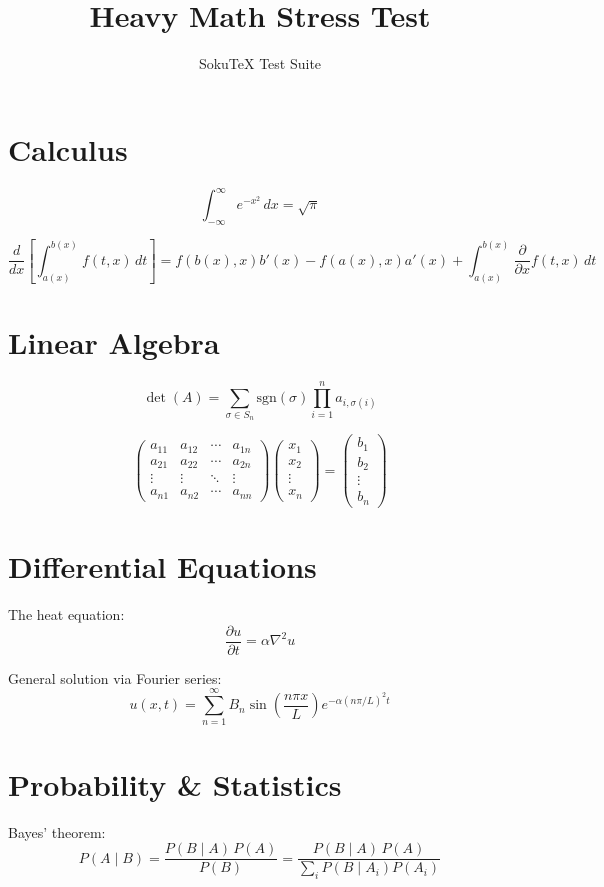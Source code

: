 \documentclass[letterpaper]{article}
\title{Heavy Math Stress Test}
\author{SokuTeX Test Suite}
\begin{document}
\maketitle

\section{Calculus}
\[
    \int_{-\infty}^{\infty} e^{-x^2} \, dx = \sqrt{\pi}
\]

\[
    \frac{d}{dx}\left[\int_{a(x)}^{b(x)} f(t, x)\, dt\right] =
    f(b(x), x) b'(x) - f(a(x), x) a'(x) + \int_{a(x)}^{b(x)} \frac{\partial}{\partial x} f(t, x)\, dt
\]

\section{Linear Algebra}
\[
    \det(A) = \sum_{\sigma \in S_n} \text{sgn}(\sigma) \prod_{i=1}^n a_{i, \sigma(i)}
\]

\[
    \begin{pmatrix}
        a_{11} & a_{12} & \cdots & a_{1n} \\
        a_{21} & a_{22} & \cdots & a_{2n} \\
        \vdots & \vdots & \ddots & \vdots \\
        a_{n1} & a_{n2} & \cdots & a_{nn}
    \end{pmatrix}
    \begin{pmatrix} x_1 \\ x_2 \\ \vdots \\ x_n \end{pmatrix}
    =
    \begin{pmatrix} b_1 \\ b_2 \\ \vdots \\ b_n \end{pmatrix}
\]

\section{Differential Equations}
The heat equation:
\[
    \frac{\partial u}{\partial t} = \alpha \nabla^2 u
\]

General solution via Fourier series:
\[
    u(x, t) = \sum_{n=1}^{\infty} B_n \sin\left(\frac{n\pi x}{L}\right) e^{-\alpha (n\pi/L)^2 t}
\]

\section{Probability \& Statistics}
Bayes' theorem:
\[
    P(A \mid B) = \frac{P(B \mid A) \, P(A)}{P(B)}
    = \frac{P(B \mid A) \, P(A)}{\sum_{i} P(B \mid A_i) P(A_i)}
\]
\end{document}
